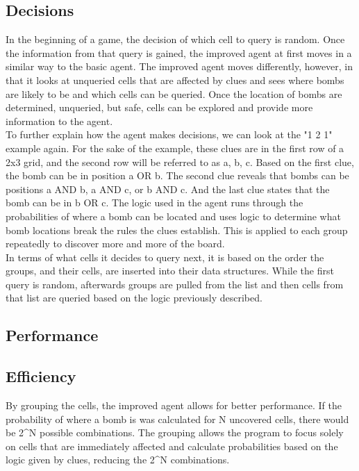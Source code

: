 \documentclass[13pt]{report}
\begin{document}
\subsection*{Decisions}
In the beginning of a game, the decision of which cell to query is random. Once the information from that query is gained, the improved agent at first moves in a similar way to the basic agent. The improved agent moves differently, however, in that it looks at unqueried cells that are affected by clues and sees where bombs are likely to be and which cells can be queried. Once the location of bombs are determined, unqueried, but safe, cells can be explored and provide more information to the agent.\\
To further explain how the agent makes decisions, we can look at the "1 2 1" example again. For the sake of the example, these clues are in the first row of a 2x3 grid, and the second row will be referred to as a, b, c. Based on the first clue, the bomb can be in position a OR b. The second clue reveals that bombs can be positions a AND b, a AND c, or b AND c. And the last clue states that the bomb can be in b OR c. The logic used in the agent runs through the probabilities of where a bomb can be located and uses logic to determine what bomb locations break the rules the clues establish. This is applied to each group repeatedly to discover more and more of the board.\\
In terms of what cells it decides to query next, it is based on the order the groups, and their cells, are inserted into their data structures. While the first query is random, afterwards groups are pulled from the list and then cells from that list are queried based on the logic previously described.

\subsection*{Performance}

\subsection*{Efficiency}
By grouping the cells, the improved agent allows for better performance. If the probability of where a bomb is was calculated for N uncovered cells, there would be 2^N possible combinations. The grouping allows the program to focus solely on cells that are immediately affected and calculate probabilities based on the logic given by clues, reducing the 2^N combinations.
\end{document}

